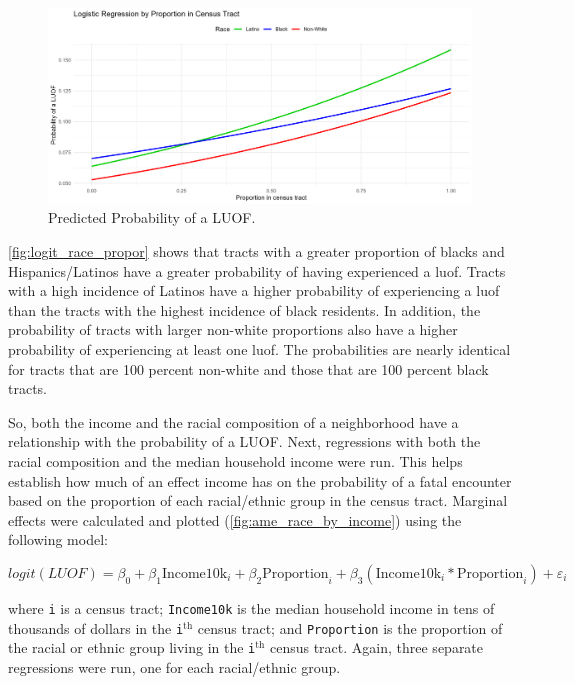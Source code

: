 \documentclass[12pt]{article}
\begin{document}
\begin{figure}[H]
  \centering %
  \includegraphics[width=\linewidth]{images/race_proportions_logit}
  \captionsetup{justification=centering, singlelinecheck=false, margin=2cm}
  \caption[Predicted Probability of a LUOF (Race Only)]{Predicted Probability of a LUOF.}
  \label{fig:logit_race_propor}
\end{figure}

\autoref{fig:logit_race_propor} shows that tracts with a greater proportion of blacks and Hispanics/Latinos have a greater probability of having experienced a \acrfull{luof}. Tracts with a high incidence of Latinos have a higher probability of experiencing a \acrshort{luof} than the tracts with the highest incidence of black residents. In addition, the probability of tracts with larger non-white proportions also have a higher probability of experiencing at least one \acrshort{luof}. The probabilities are nearly identical for tracts that are 100 percent non-white and those that are 100 percent black tracts.

So, both the income and the racial composition of a neighborhood have a relationship with the probability of a LUOF. Next, regressions with both the racial composition and the median household income were run. This helps establish how much of an effect income has on the probability of a fatal encounter based on the proportion of each racial/ethnic group in the census tract. Marginal effects were calculated and plotted (\autoref{fig:ame_race_by_income}) using the following model:

\begin{equation}
logit(LUOF) = \beta_0 + \beta_1 \text{Income10k}_i + \beta_2 \text{Proportion}_i + \beta_3 (\text{Income10k}_i \ast \text{Proportion}_i) + \varepsilon_i
\label{eq:logit_interaction}
\end{equation}

\noindent{}where \texttt{i} is a census tract; \texttt{Income10k} is the median household income in tens of thousands of dollars in the \texttt{i}$^\text{th}$ census tract; and \texttt{Proportion} is the proportion of the racial or ethnic group living in the \texttt{i}$^\text{th}$ census tract. Again, three separate regressions were run, one for each racial/ethnic group.
\end{document}
